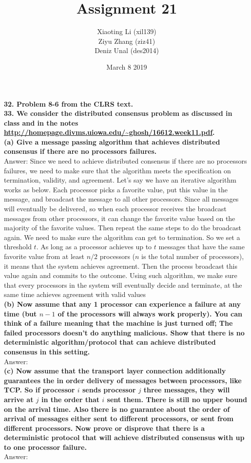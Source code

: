 \documentclass{article}
\title{Assignment 21}
\author{Xiaoting Li (xil139) \\
Ziyu Zhang (ziz41) \\
Deniz Unal (des2014)}
\date{March 8 2019}
\begin{document}
\maketitle

\noindent
\textbf{32. Problem 8-6 from the CLRS text.}\\ \newline
\textbf{33. We consider the distributed consensus problem as discussed in class and in the notes \url{http://homepage.divms.uiowa.edu/~ghosh/16612.week11.pdf}.}\\ \newline
\textbf{(a) Give a message passing algorithm that achieves distributed consensus if there are no processors failures.} \\ \newline
Answer: Since we need to achieve distributed consensus if there are no processors failures, we need to make sure that the algorithm meets the specification on termination, validity, and agreement. Let's say we have an iterative algorithm works as below. Each processor picks a favorite value, put this value in the message, and broadcast the message to all other processors. Since all messages will eventually be delivered, so when each processor receives the broadcast messages from other processors, it can change the favorite value based on the majority of the favorite values. Then repeat the same steps to do the broadcast again. We need to make sure the algorithm can get to termination. So we set a threshold $t$. As long as a processor achieves up to $t$ messages that have the same favorite value from at least $n/2$ processors ($n$ is the total number of processors), it means that the system achieves agreement. Then the process broadcast this value again and commits to the outcome. Using such algorithm, we make sure that every processors in the system will eventually decide and terminate, at the same time achieves agreement with valid values  \\ \newline
\textbf{(b) Now assume that any 1 processor can experience a failure at any time (but $n-1$ of the processors will always work properly). You can think of a failure meaning that the machine is just turned off; The failed processors doesn’t do anything malicious. Show that there is no deterministic algorithm/protocol that can achieve distributed consensus in this setting.} \\ \newline 
Answer: \\ \newline
\textbf{(c) Now assume that the transport layer connection additionally guarantees the in order delivery of messages between processors, like TCP. So if processor $i$ sends processor $j$ three messages, they will arrive at $j$ in the order that $i$ sent them. There is still no upper bound on the arrival time. Also there is no guarantee about the order of arrival of messages either sent to different processors, or sent from different processors. Now prove or disprove that there is a deterministic protocol that will achieve distributed consensus with up to one processor failure.}\\ \newline
Answer:
\end{document}
